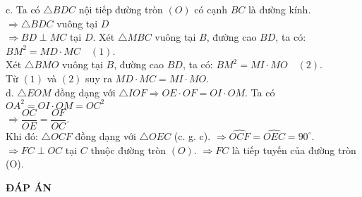 \begin{ex}
{c. Ta có $\triangle BDC$ nội tiếp đường tròn $(O)$ có cạnh $BC$ là đường kính.
$\Rightarrow \triangle BDC$ vuông tại $D$\\
$\Rightarrow BD \perp MC$ tại $D$.
Xét $\triangle MBC$ vuông tại $B$, đường cao $BD$, ta có: $BM^2 = MD\cdot MC \quad (1)$.\\
Xét $\triangle BMO$ vuông tại $B$, đường cao $BD$, ta có: $BM^2 = MI\cdot MO \quad (2)$.\\
Từ $(1)$ và $(2)$ suy ra $MD\cdot MC = MI\cdot MO$.\\
d. $\triangle EOM$ đồng dạng với $\triangle IOF \Rightarrow OE \cdot OF = OI\cdot OM.$
Ta có $OA^2 = OI\cdot OM = OC^2$\\
$\Rightarrow \dfrac{OC}{OE}=\dfrac{OF}{OC}$.\\
Khi đó: $\triangle OCF$ đồng dạng với $\triangle OEC$ (c. g. c).
$\Rightarrow \widehat{OCF}=\widehat{OEC}=90^\circ$.
$\Rightarrow FC\perp OC$ tại $C$ thuộc đường tròn $(O)$.
$\Rightarrow FC$ là tiếp tuyến của đường tròn (O).
}
\end{ex}
\newpage
\begin{center}
	\textbf{ĐÁP ÁN}
\end{center}
\begin{multicols}{10}
	 
\end{multicols}
